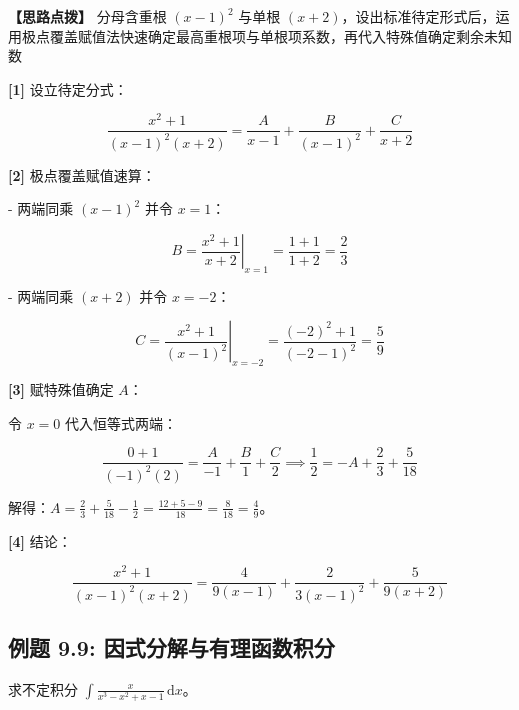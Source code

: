 \documentclass[11pt,a4paper,UTF8]{ctexart}
\begin{document}
\textbf{\color{DeepPurple}【思路点拨】} 分母含重根 $(x-1)^2$ 与单根 $(x+2)$，设出标准待定形式后，运用极点覆盖赋值法快速确定最高重根项与单根项系数，再代入特殊值确定剩余未知数


\begin{solbox}[分步推导与答题规范]
\textbf{[1]} 设立待定分式：


\begin{equation*}
\frac{x^2+1}{(x-1)^2(x+2)} = \frac{A}{x-1} + \frac{B}{(x-1)^2} + \frac{C}{x+2}
\end{equation*}


\textbf{[2]} 极点覆盖赋值速算：

- 两端同乘 $(x-1)^2$ 并令 $x=1$：


\begin{equation*}
B = \left. \frac{x^2+1}{x+2} \right|_{x=1} = \frac{1+1}{1+2} = \frac{2}{3}
\end{equation*}


- 两端同乘 $(x+2)$ 并令 $x=-2$：


\begin{equation*}
C = \left. \frac{x^2+1}{(x-1)^2} \right|_{x=-2} = \frac{(-2)^2+1}{(-2-1)^2} = \frac{5}{9}
\end{equation*}


\textbf{[3]} 赋特殊值确定 $A$：

令 $x=0$ 代入恒等式两端：


\begin{equation*}
\frac{0+1}{(-1)^2(2)} = \frac{A}{-1} + \frac{B}{1} + \frac{C}{2} \implies \frac{1}{2} = -A + \frac{2}{3} + \frac{5}{18}
\end{equation*}


解得：$A = \frac{2}{3} + \frac{5}{18} - \frac{1}{2} = \frac{12+5-9}{18} = \frac{8}{18} = \frac{4}{9}$。

\textbf{[4]} 结论：


\begin{equation*}
\frac{x^2+1}{(x-1)^2(x+2)} = \frac{4}{9(x-1)} + \frac{2}{3(x-1)^2} + \frac{5}{9(x+2)}
\end{equation*}

\end{solbox}


\subsection{例题 9.9: 因式分解与有理函数积分}

求不定积分 $\int \frac{x}{x^3-x^2+x-1}\,\mathrm{d}x$。
\end{document}
